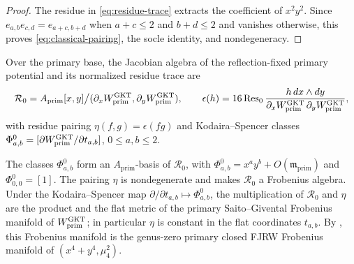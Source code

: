 \begin{proof}
The residue in \eqref{eq:residue-trace} extracts the coefficient of
$x^2y^2$.  Since $e_{a,b}e_{c,d}=e_{a+c,b+d}$ when $a+c\leq2$ and $b+d\leq2$
and vanishes otherwise, this proves \eqref{eq:classical-pairing}, the socle
identity, and nondegeneracy.
\end{proof}

Over the primary base, the Jacobian algebra of the reflection-fixed primary
potential and its normalized residue trace are
\begin{equation}\label{eq:source-primary-Jacobian}
 \mathcal R_0=A_{\mathrm{prim}}[x,y]\big/
  (\partial_xW^{\mathrm{GKT}}_{\mathrm{prim}},
   \partial_yW^{\mathrm{GKT}}_{\mathrm{prim}}),
 \qquad
 \epsilon(h)=16\operatorname{Res}_0
 \frac{h\,dx\wedge dy}
 {\partial_xW^{\mathrm{GKT}}_{\mathrm{prim}}\,\partial_yW^{\mathrm{GKT}}_{\mathrm{prim}}},
\end{equation}
with residue pairing $\eta(f,g)=\epsilon(fg)$ and Kodaira--Spencer classes
$\Phi^0_{a,b}=[\partial W^{\mathrm{GKT}}_{\mathrm{prim}}/\partial t_{a,b}]$,
$0\leq a,b\leq2$.

\begin{lemma}
\label{lem:source-Frobenius}
The classes $\Phi^0_{a,b}$ form an $A_{\mathrm{prim}}$-basis of
$\mathcal R_0$, with $\Phi^0_{a,b}=x^ay^b+O(\mathfrak m_{\mathrm{prim}})$
and $\Phi^0_{0,0}=[1]$.  The pairing $\eta$ is nondegenerate and makes
$\mathcal R_0$ a Frobenius algebra.  Under the Kodaira--Spencer map
$\partial/\partial t_{a,b}\mapsto\Phi^0_{a,b}$, the multiplication of
$\mathcal R_0$ and $\eta$ are the product and the flat metric of the primary
Saito--Givental Frobenius manifold of $W^{\mathrm{GKT}}_{\mathrm{prim}}$; in
particular $\eta$ is constant in the flat coordinates $t_{a,b}$.  By
\cite[Thm.~0.3 and Rem.~0.4(2)]{grossetal2022open}, this Frobenius manifold
is the genus-zero primary closed FJRW Frobenius manifold of
$(x^4+y^4,\mu_4^2)$.
\end{lemma}

